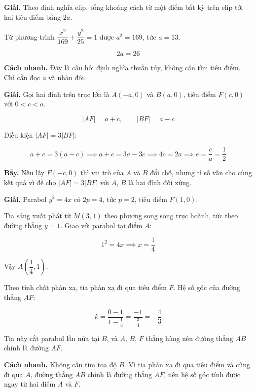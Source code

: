 \documentclass[11pt, a4paper]{article}
\begin{document}
\begin{dapan}[10 — Đáp án D]
\textbf{Giải.} Theo định nghĩa elip, tổng khoảng cách từ một điểm bất kỳ trên elip tới hai tiêu điểm bằng $2a$.

Từ phương trình $\dfrac{x^2}{169} + \dfrac{y^2}{25} = 1$ được $a^2 = 169$, tức $a = 13$.

$$2a = 26$$

\textbf{Cách nhanh.} Đây là câu hỏi định nghĩa thuần túy, không cần tìm tiêu điểm. Chỉ cần đọc $a$ và nhân đôi.
\end{dapan}

\begin{dapan}[11 — Đáp án C]
\textbf{Giải.} Gọi hai đỉnh trên trục lớn là $A(-a, 0)$ và $B(a, 0)$, tiêu điểm $F(c, 0)$ với $0 < c < a$.

$$|AF| = a + c, \qquad |BF| = a - c$$

Điều kiện $|AF| = 3|BF|$:

$$a + c = 3(a - c) \implies a + c = 3a - 3c \implies 4c = 2a \implies e = \frac{c}{a} = \frac{1}{2}$$

\textbf{Bẫy.} Nếu lấy $F(-c, 0)$ thì vai trò của $A$ và $B$ đổi chỗ, nhưng tỉ số vẫn cho cùng kết quả vì đề cho $|AF| = 3|BF|$ với $A$, $B$ là hai đỉnh đối xứng.
\end{dapan}

\begin{dapan}[12 — Đáp án A]
\textbf{Giải.} Parabol $y^2 = 4x$ có $2p = 4$, tức $p = 2$, tiêu điểm $F(1, 0)$.

Tia sáng xuất phát từ $M(3, 1)$ theo phương song song trục hoành, tức theo đường thẳng $y = 1$. Giao với parabol tại điểm $A$:

$$1^2 = 4x \implies x = \frac{1}{4}$$

Vậy $A\left(\dfrac{1}{4}, 1\right)$.

Theo tính chất phản xạ, tia phản xạ đi qua tiêu điểm $F$. Hệ số góc của đường thẳng $AF$:

$$k = \frac{0 - 1}{1 - \frac{1}{4}} = \frac{-1}{\frac{3}{4}} = -\frac{4}{3}$$

Tia này cắt parabol lần nữa tại $B$, và $A$, $B$, $F$ thẳng hàng nên đường thẳng $AB$ chính là đường $AF$.

\textbf{Cách nhanh.} Không cần tìm tọa độ $B$. Vì tia phản xạ đi qua tiêu điểm và cũng đi qua $A$, đường thẳng $AB$ chính là đường thẳng $AF$, nên hệ số góc tính được ngay từ hai điểm $A$ và $F$.
\end{dapan}
\end{document}
